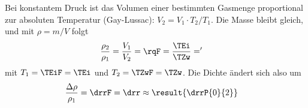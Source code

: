 Bei konstantem Druck ist das Volumen einer bestimmten Gasmenge proportional zur absoluten Temperatur (Gay-Lussac): $V_2 = V_1\cdot T_2/T_1$. Die Masse bleibt gleich, und mit $\rho = m/V$ folgt
\begin{align}
 \frac{\rho_2}{\rho_1} &= \frac{V_1}{V_2} = \rqF = \frac{\TEi}{\TZw} = \rq
\end{align}
mit $T_1 = \TEiF = \TEi$ und $T_2 = \TZwF = \TZw$. Die Dichte ändert sich also um
\begin{align}
 \frac{\Delta\rho}{\rho_1} &= \drrF = \drr \approx \result{\drrP{0}{2}}
\end{align}
